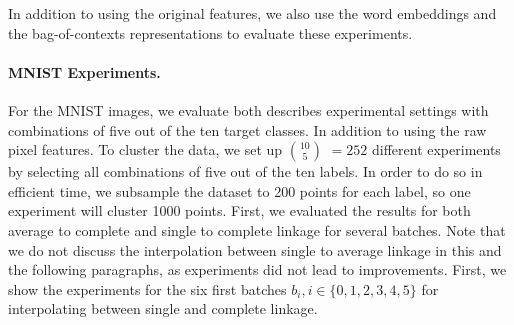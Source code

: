 \begin{table}[H]
  \caption{Proposed Subcategories for ``Kitchen Item''.}
  \label{tbl:kitchenitems}
\end{table}

In addition to using the original features, we also use the word embeddings and the bag-of-contexts representations to evaluate these experiments.


\paragraph{MNIST Experiments.} For the MNIST images, we evaluate both describes experimental settings with combinations of five out of the ten target classes. In addition to using the raw pixel features. To cluster the data, we set up $10 \choose 5$ $= 252$ different experiments by selecting all combinations of five out of the ten labels. In order to do so in efficient time, we subsample the dataset to 200 points for each label, so one experiment will cluster 1000 points. First, we evaluated the results for both average to complete and single to complete linkage for several batches. Note that we do not discuss the interpolation between single to average linkage in this and the following paragraphs, as experiments did not lead to improvements. First, we show the experiments for the six first batches $b_i, i \in \{0, 1, 2, 3, 4, 5\}$ for interpolating between single and complete linkage.

